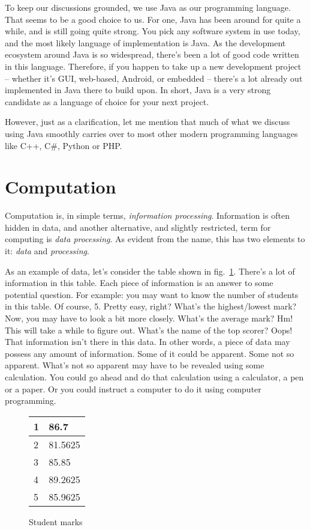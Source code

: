 \documentclass[12pt,a4paper]{article}
\begin{document}
To keep our discussions grounded, we use Java as our programming language. That seems to be a good choice to us. For one, Java has been around for quite a while, and is still going quite strong. You pick any software system in use today, and the most likely language of implementation is Java. As the development ecosystem around Java is so widespread, there's been a lot of good code written in this language. Therefore, if you happen to take up a new development project -- whether it's GUI, web-based, Android, or embedded -- there's a lot already out implemented in Java there to build upon. In short, Java is a very strong candidate as a language of choice for your next project. 

However, just as a clarification, let me mention that much of what we discuss using Java smoothly carries over to most other modern programming languages like C++, C\#, Python or PHP. 

\section{Computation}
Computation is, in simple terms, \emph{information processing}. Information is often hidden in data, and another alternative, and slightly restricted, term for computing is \emph{data processing}. As evident from the name, this has two elements to it: \emph{data} and \emph{processing}.


As an example of data, let's consider the table shown in fig.~\ref{f:data}. There's a lot of information in this table. Each piece of information is an answer to some potential question. For example: you may want to know the number of students in this table. Of course, 5. Pretty easy, right? What's the highest/lowest mark? Now, you may have to look a bit more closely. What's the average mark? Hm! This will take a while to figure out. What's the name of the top scorer? Oops! That information isn't there in this data. In other words, a piece of data may possess any amount of information. Some of it could be apparent. Some not so apparent. What's not so apparent may have to be revealed using some calculation. You could go ahead and do that calculation using a calculator, a pen or a paper. Or you could instruct a computer to do it using computer programming.

\begin{figure}[H]
\begin{center}
\begin{tabular}{| l | l |}
\hline
1 & 86.7    \\
\hline
2 & 81.5625 \\
\hline
3 & 85.85   \\
\hline
4 & 89.2625 \\
\hline
5 & 85.9625 \\
\hline
\end{tabular}
\end{center}
\caption{Student marks}
\label{f:data}
\end{figure}
\end{document}

